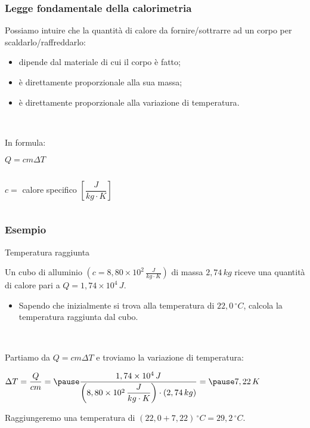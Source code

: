 \documentclass[]{beamer}
\theoremstyle{plain}
\begin{document}
\begin{frame}
\frametitle{Legge fondamentale della calorimetria}
Possiamo intuire che la quantità di calore da fornire/sottrarre ad un corpo per scaldarlo/raffreddarlo:
\begin{itemize}
  \item \alert<1>{dipende dal materiale} di cui il corpo è fatto;\pause
  \item è \alert<2>{direttamente proporzionale alla sua massa};\pause
  \item è \alert<3>{direttamente proporzionale alla variazione di temperatura}.\pause
\end{itemize}

~

In formula:
\begin{center}
\colorbox{marroncino!30}{$ Q = c  m  \Delta T $}
\end{center}

\begin{columns}
\begin{column}{0.45\textwidth}
$ c = $ calore specifico $ \left[ \dfrac{J}{kg \cdot K} \right] $
\end{column}
\begin{column}{0.45\textwidth}
\end{column}
\end{columns}
\end{frame}


\begin{frame}
\frametitle{Esempio}
\begin{exampleblock}{Temperatura raggiunta}
{\small Un cubo di alluminio $\left( c = 8,80 \times 10^2 \, \frac{J}{kg \cdot K} \right)$ di massa $ 2,74 \, kg $ riceve una quantità di calore pari a $ Q = 1,74 \times 10^4 \, J $.
\begin{itemize}
  \item Sapendo che inizialmente si trova alla temperatura di $ 22,0 \, ^\circ C $, calcola la temperatura raggiunta dal cubo.
\end{itemize}
}
\end{exampleblock}\pause

~

Partiamo da $ Q = cm\Delta T $ e troviamo la variazione di temperatura:\pause
\begin{center}
$ \Delta T = \dfrac{Q}{cm} = \pause \dfrac{1,74 \times 10^4 \, J}{\left( 8,80 \times 10^2 \, \dfrac{J}{kg \cdot K} \right)\cdot (2,74 \, kg)} = \pause 7,22 \, K $
\end{center}\pause
Raggiungeremo una temperatura di $ (22,0 + 7,22) \, ^\circ C = 29,2 \, ^\circ C $.
\end{frame}
\end{document}

